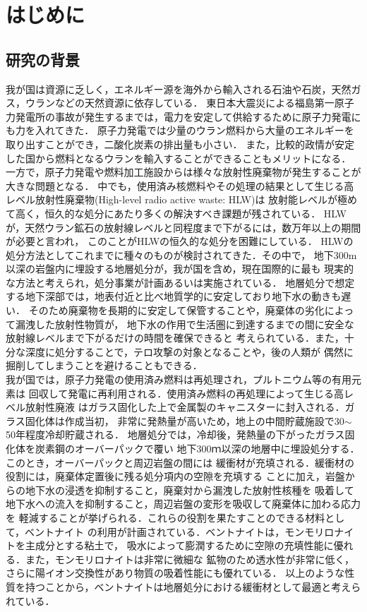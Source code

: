 ﻿\chapter{はじめに}
\section{研究の背景}
我が国は資源に乏しく，エネルギー源を海外から輸入される石油や石炭，天然ガス，ウランなどの天然資源に依存している．
東日本大震災による福島第一原子力発電所の事故が発生するまでは，電力を安定して供給するために原子力発電にも力を入れてきた．
原子力発電では少量のウラン燃料から大量のエネルギーを取り出すことができ，二酸化炭素の排出量も小さい．
また，比較的政情が安定した国から燃料となるウランを輸入することができることもメリットになる．
一方で，原子力発電や燃料加工施設からは様々な放射性廃棄物が発生することが大きな問題となる．
中でも，使用済み核燃料やその処理の結果として生じる高レベル放射性廃棄物(High-level radio active waste: HLW)は
放射能レベルが極めて高く，恒久的な処分にあたり多くの解決すべき課題が残されている．
HLWが，天然ウラン鉱石の放射線レベルと同程度まで下がるには，数万年以上の期間が必要と言われ，
このことがHLWの恒久的な処分を困難にしている\cite{Fujiie}．
HLWの処分方法としてこれまでに種々のものが検討されてきた．その中で，
地下300m以深の岩盤内に埋設する地層処分が，我が国を含め，現在国際的に最も
現実的な方法と考えられ，処分事業が計画あるいは実施されている\cite{NUMO_URL,NUMO}．
地層処分で想定する地下深部では，地表付近と比べ地質学的に安定しており地下水の動きも遅い．
そのため廃棄物を長期的に安定して保管することや，廃棄体の劣化によって漏洩した放射性物質が，
地下水の作用で生活圏に到達するまでの間に安全な放射線レベルまで下がるだけの時間を確保できると
考えられている．また，十分な深度に処分することで，テロ攻撃の対象となることや，後の人類が
偶然に掘削してしまうことを避けることもできる．\\

我が国では，原子力発電の使用済み燃料は再処理され，プルトニウム等の有用元素は
回収して発電に再利用される．使用済み燃料の再処理によって生じる高レベル放射性廃液
はガラス固化した上で金属製のキャニスターに封入される．ガラス固化体は作成当初，
非常に発熱量が高いため，地上の中間貯蔵施設で30$\sim$50年程度冷却貯蔵される．
地層処分では，冷却後，発熱量の下がったガラス固化体を炭素鋼のオーバーパックで覆い
地下300ｍ以深の地層中に埋設処分する．このとき，オーバーパックと周辺岩盤の間には
緩衝材が充填される．緩衝材の役割には，廃棄体定置後に残る処分項内の空隙を充填する
ことに加え，岩盤からの地下水の浸透を抑制すること，廃棄対から漏洩した放射性核種を
吸着して地下水への流入を抑制すること，周辺岩盤の変形を吸収して廃棄体に加わる応力を
軽減することが挙げられる．これらの役割を果たすことのできる材料として，ベントナイト
の利用が計画されている．ベントナイトは，モンモリロナイトを主成分とする粘土で，
吸水によって膨潤するために空隙の充填性能に優れる．また，モンモリロナイトは非常に微細な
鉱物のため透水性が非常に低く，さらに陽イオン交換性があり物質の吸着性能にも優れている．
以上のような性質を持つことから，ベントナイトは地層処分における緩衝材として最適と考えられている．\\

